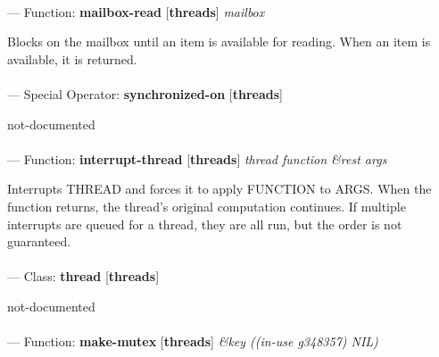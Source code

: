 \paragraph{}
\label{THREADS:MAILBOX-READ}
--- Function: \textbf{mailbox-read} [\textbf{threads}] \textit{mailbox}

\begin{adjustwidth}{5em}{5em}
Blocks on the mailbox until an item is available for reading.
When an item is available, it is returned.
\end{adjustwidth}

\paragraph{}
\label{THREADS:SYNCHRONIZED-ON}
--- Special Operator: \textbf{synchronized-on} [\textbf{threads}] \textit{}

\begin{adjustwidth}{5em}{5em}
not-documented
\end{adjustwidth}

\paragraph{}
\label{THREADS:INTERRUPT-THREAD}
--- Function: \textbf{interrupt-thread} [\textbf{threads}] \textit{thread function \&rest args}

\begin{adjustwidth}{5em}{5em}
Interrupts THREAD and forces it to apply FUNCTION to ARGS.
When the function returns, the thread's original computation continues. If  multiple interrupts are queued for a thread, they are all run, but the order is not guaranteed.
\end{adjustwidth}

\paragraph{}
\label{THREADS:THREAD}
--- Class: \textbf{thread} [\textbf{threads}] \textit{}

\begin{adjustwidth}{5em}{5em}
not-documented
\end{adjustwidth}

\paragraph{}
\label{THREADS:MAKE-MUTEX}
--- Function: \textbf{make-mutex} [\textbf{threads}] \textit{\&key ((in-use g348357) NIL)}

